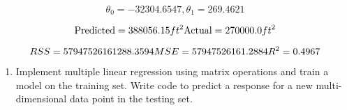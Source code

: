 \documentclass[11pt]{article}
\providecommand{\tightlist}{%
      \setlength{\itemsep}{0pt}\setlength{\parskip}{0pt}}
\begin{document}
    $$\theta_0 = -32304.6547, \theta_1 = 269.4621$$

    
    $$\text{Predicted}=388056.15 \space ft^2\\ \text{Actual}= 270000.0\space ft^2$$

    
    $$RSS = 57947526161288.3594 \\ MSE = 57947526161.2884 \\ R^2 = 0.4967$$

    
    \begin{enumerate}
\def\labelenumi{\arabic{enumi}.}
\setcounter{enumi}{1}
\tightlist
\item
  Implement multiple linear regression using matrix operations and train
  a model on the training set. Write code to predict a response for a
  new multi-dimensional data point in the testing set.
\end{enumerate}
\end{document}
